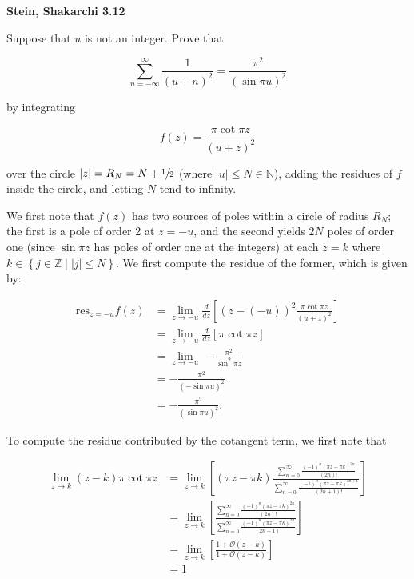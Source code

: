 \textbf{Stein, Shakarchi 3.12}

Suppose that $u$ is not an integer. Prove that

$$
\sum\limits_{n = -\infty}^{\infty} \frac{1}{(u + n)^2} = \frac{\pi^2}{(\sin{\pi u})^2}
$$

by integrating

$$
f(z) = \frac{\pi \cot{\pi z}}{(u + z)^2}
$$

over the circle $|z| = R_N = N + \sfrac{1}{2}$ (where $|u| \le N \in \mathbb{N}$), adding the residues of $f$ inside the 
circle, and letting $N$ tend to infinity.

\begin{solution}

  We first note that $f(z)$ has two sources of poles within a circle of radius $R_N$; the first is a pole of order 2 at 
  $z = -u$, and the second yields $2 N$ poles of order one (since $\sin{\pi z}$ has poles of order one at the integers) 
  at each $z = k$ where $k \in \left\{j \in \mathbb{Z} \mid |j| \le N \right\}$. We first compute the residue of the 
  former, which is given by:

  \begin{align*}
    \text{res}_{z = -u} f(z) &= \lim\limits_{z \to -u} \frac{d}{dz} \left[ (z - (-u))^2 \frac{\pi \cot{\pi z}}{(u + z)^2} \right] \\
                             &= \lim\limits_{z \to -u} \frac{d}{dz} \left[ \pi \cot{\pi z}\right] \\
                             &= \lim\limits_{z \to -u} -\frac{\pi^2}{\sin^2{\pi z}} \\
                             &= -\frac{\pi^2}{(-\sin{\pi u})^2} \\
                             &= -\frac{\pi^2}{(\sin{\pi u})^2}.
  \end{align*}

  To compute the residue contributed by the cotangent term, we first note that 

  \begin{align*}
    \lim\limits_{z \to k} (z - k) \pi \cot{\pi z}
      &= \lim\limits_{z \to k} \left[(\pi z - \pi k) \frac{
          \sum_{n=0}^{\infty} \frac{(-1)^n (\pi z - \pi k)^{2n}}{(2n)!}
        }{
          \sum_{n=0}^{\infty} \frac{(-1)^n (\pi z - \pi k)^{2n+1}}{(2n + 1)!}
        } \right] \\
      &= \lim\limits_{z \to k} \left[
        \frac{
          \sum_{n=0}^{\infty} \frac{(-1)^n (\pi z - \pi k)^{2n}}{(2n)!}
        }{
          \sum_{n=0}^{\infty} \frac{(-1)^n (\pi z - \pi k)^{2n}}{(2n + 1)!}
        }
      \right] \\
      &= \lim\limits_{z \to k} \left[
        \frac{1 + \mathcal{O}(z - k)}{1 + \mathcal{O}(z - k)} 
      \right] \\
      &= 1
  \end{align*}
  

\end{solution}
